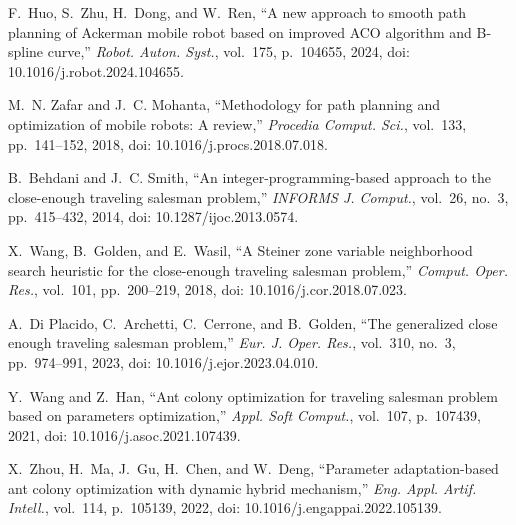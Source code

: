 
F.~Huo, S.~Zhu, H.~Dong, and W.~Ren,
``A new approach to smooth path planning of Ackerman mobile robot based on improved ACO algorithm and B-spline curve,''
\textit{Robot. Auton. Syst.}, vol.~175, p.~104655, 2024,
doi: 10.1016/j.robot.2024.104655.

M.~N. Zafar and J.~C. Mohanta,
``Methodology for path planning and optimization of mobile robots: A review,''
\textit{Procedia Comput. Sci.}, vol.~133, pp.~141--152, 2018,
doi: 10.1016/j.procs.2018.07.018.


B.~Behdani and J.~C. Smith,
``An integer-programming-based approach to the close-enough traveling salesman problem,''
\textit{INFORMS J. Comput.}, vol.~26, no.~3, pp.~415--432, 2014,
doi: 10.1287/ijoc.2013.0574.

X.~Wang, B.~Golden, and E.~Wasil,
``A Steiner zone variable neighborhood search heuristic for the close-enough traveling salesman problem,''
\textit{Comput. Oper. Res.}, vol.~101, pp.~200--219, 2018,
doi: 10.1016/j.cor.2018.07.023.

A.~Di Placido, C.~Archetti, C.~Cerrone, and B.~Golden,
``The generalized close enough traveling salesman problem,''
\textit{Eur. J. Oper. Res.}, vol.~310, no.~3, pp.~974--991, 2023,
doi: 10.1016/j.ejor.2023.04.010.


Y.~Wang and Z.~Han,
``Ant colony optimization for traveling salesman problem based on parameters optimization,''
\textit{Appl. Soft Comput.}, vol.~107, p.~107439, 2021,
doi: 10.1016/j.asoc.2021.107439.

X.~Zhou, H.~Ma, J.~Gu, H.~Chen, and W.~Deng,
``Parameter adaptation-based ant colony optimization with dynamic hybrid mechanism,''
\textit{Eng. Appl. Artif. Intell.}, vol.~114, p.~105139, 2022,
doi: 10.1016/j.engappai.2022.105139.

